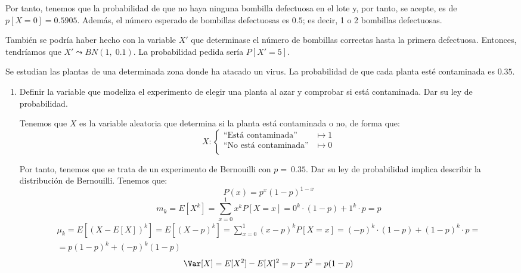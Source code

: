 \begin{ejercicio}
\begin{itemize}
        Por tanto, tenemos que la probabilidad de que no haya ninguna bombilla defectuosa en el lote y, por tanto, se acepte, es de $p[X=0]=0.5905$. Además, el número esperado de bombillas defectuosas es $0.5$; es decir, 1 o 2 bombillas defectuosas.

        \begin{observacion}
            También se podría haber hecho con la variable $X'$ que determinase el número de bombillas correctas hasta la primera defectuosa. Entonces, tendríamos que $X'\leadsto BN(1,\;0.1)$. La probabilidad pedida sería $P[X'=5]$.
        \end{observacion}
     \end{itemize}
\end{ejercicio}



\begin{ejercicio}
    Se estudian las plantas de una determinada zona donde ha atacado un virus. La probabilidad de que cada planta esté contaminada es $0.35$.
    \begin{enumerate}
        \item  Definir la variable que modeliza el experimento de elegir una planta al azar y comprobar si está contaminada. Dar su ley de probabilidad.

        Tenemos que $X$ es la variable aleatoria que determina si la planta está contaminada o no, de forma que:
        \begin{equation*}
            X:\left\{\begin{array}{cc}
                \text{``Está contaminada''} & \longmapsto 1 \\
                \text{``No está contaminada''} & \longmapsto 0 \\
            \end{array}\right.    
        \end{equation*}

        Por tanto, tenemos que se trata de un experimento de Bernouilli con $p=~0.35$. Dar su ley de probabilidad implica describir la distribución de Bernouilli. Tenemos que:
        \begin{equation*}
            P(x)=p^x(1-p)^{1-x}
        \end{equation*}
        \begin{equation*}
            m_k=E[X^k] = \sum_{x=0}^1 x^k P[X=x] = 0^k\cdot (1-p) + 1^k\cdot p = p
        \end{equation*}
        \begin{multline*}
            \mu_k=E[(X - E[X])^k] =
            E[(X - p)^k]
            = \sum_{x=0}^1 (x-p)^k P[X=x] = (-p)^k\cdot (1-p) + (1-p)^k\cdot p
            =\\= p(1-p)^k +(-p)^k(1-p)
        \end{multline*}
        \begin{equation*}
            \Var[X]=E[X^2]-E[X]^2 = p-p^2 = p(1-p)
        \end{equation*}
        

\end{enumerate}
\end{ejercicio}
